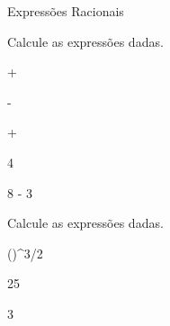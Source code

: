 \begin{exercicios}{Expressões Racionais}
    \begin{exercicio}
        Calcule as expressões dadas.
        \begin{mathlist}
            \item {} + 
            \item {} - \pi
            \item {} + 
        \end{mathlist}    
        \begin{answers}
            \begin{mathlist}[3]
                \item 4
                \item {}
                \item 8 - 3 
            \end{mathlist}
        \end{answers}
    \end{exercicio}
    
    \begin{exercicio}
        Calcule as expressões dadas.
        \begin{mathlist}[2]
            \item \left(\right)^{3/2}
            \item {}
            \item {}
            \item {}
        \end{mathlist}        
        \begin{answers}
            \begin{mathlist}[4]
                \item {}
                \item 25
                \item {}
                \item 3 
            \end{mathlist}
        \end{answers}
    \end{exercicio}
    

\end{exercicios}
